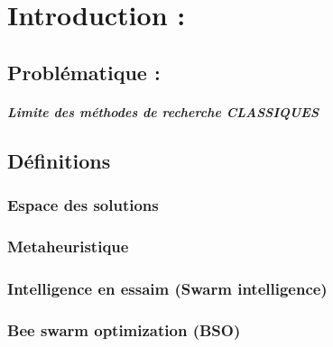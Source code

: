 
\chapter{Introduction : }
	\section{Problématique : }
	\paragraph{Limite des méthodes de recherche CLASSIQUES}
	\section{Définitions}
		\subsection{Espace des solutions}
		\paragraph{}
		
		\subsection{Metaheuristique}
		\paragraph{}
		\subsection{Intelligence en essaim (Swarm intelligence) }
		\paragraph{}
		\subsection{Bee swarm optimization (BSO)}
		\paragraph{} 